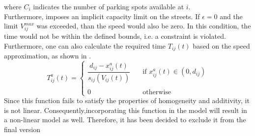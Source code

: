 where $C_i$ indicates the number of parking spots available at $i$. \\
Furthermore,  imposes an implicit capacity limit on the streets. If $\epsilon=0$ and the limit $V^{max}_{ij}$ was exceeded, than the speed would also be zero. In this condition, the time would not be within the defined bounds, i.e. a constraint is violated. \\
Furthermore, one can also calculate the required time $T_{ij}(t)$ based on the speed approximation, as shown in . 
\begin{equation}
	T_{ij}^a(t) = \begin{cases}
			\dfrac{d_{ij} - x^a_{ij}(t)}{s_{ij}(V_{ij}(t))} &\quad \text{if } x_{ij}^a(t) \in (0,d_{ij})\\
			&\\
			0 &\quad\text{otherwise }
		\end{cases}
	\label{eq:required_time} 
\end{equation}
Since this function fails to satisfy the properties of homogeneity and additivity, it is not linear. Consequently,incorporating this function in the model will result in a non-linear model as well. Therefore, it has been decided to exclude it from the final version

